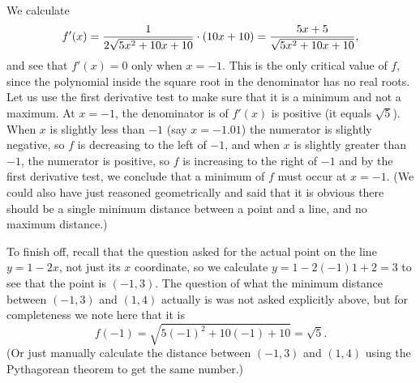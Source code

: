 We calculate
$$f'(x) = {1\over 2\sqrt{5x^2 + 10x + 10}}\cdot (10x + 10) = {5x+5\over \sqrt{5x^2+10x+10}},$$
and see that $f'(x) = 0$ only when $x=-1$. This is the only critical value of $f$, since the polynomial
inside the square root in the denominator has no real roots. Let us
use the first derivative test to make sure that it is a minimum and not a maximum.
At $x=-1$, the denominator is of $f'(x)$ is positive (it equals $\sqrt 5$). When $x$ is slightly less
than $-1$ (say $x=-1.01$) the numerator is slightly negative, so $f$ is decreasing to the left of $-1$,
and when $x$ is slightly greater than $-1$, the numerator is positive, so $f$ is increasing to the right
of $-1$ and by the first derivative test, we conclude that a minimum of $f$ must occur at $x=-1$.
(We could also have just reasoned geometrically and said that it is obvious there should be a single
minimum distance between a point and a line, and no maximum distance.)

To finish off, recall that the question asked for the actual point on the line $y=1-2x$,
not just its $x$ coordinate, so we calculate $y=1-2(-1) 1+2= 3$ to see that the point is $(-1,3)$.
The question of what the minimum distance between $(-1,3)$ and $(1,4)$ actually is was not asked explicitly
above, but for completeness we note here that it is
$$f(-1) = \sqrt{5(-1)^2 + 10(-1) + 10} = \sqrt 5.$$
(Or just manually calculate the distance between $(-1,3)$ and $(1,4)$ using the Pythagorean theorem to get
the same number.)

